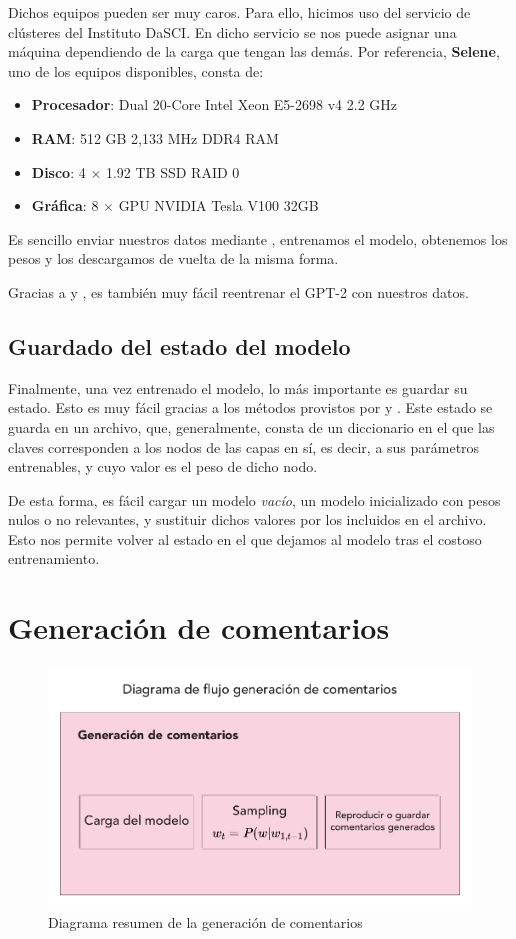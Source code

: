 Dichos equipos pueden ser muy caros. Para ello, hicimos uso del servicio de clústeres del Instituto DaSCI. En dicho servicio se nos puede asignar una máquina dependiendo de la carga que tengan las demás. Por referencia, \textbf{Selene}, uno de los equipos disponibles, consta de:
\begin{itemize}
	\item \textbf{Procesador}: Dual 20-Core Intel Xeon E5-2698 v4 2.2 GHz
	\item \textbf{RAM}: 512 GB 2,133 MHz DDR4 RAM
	\item \textbf{Disco}: 4 $\times$ 1.92 TB SSD RAID 0
	\item \textbf{Gráfica}: 8 $\times$ GPU NVIDIA Tesla V100 32GB 
\end{itemize}

Es sencillo enviar nuestros datos mediante , entrenamos el modelo, obtenemos los pesos y los descargamos de vuelta de la misma forma.

Gracias a  y , es también muy fácil reentrenar el GPT-2 con nuestros datos.

\subsection{Guardado del estado del modelo}
Finalmente, una vez entrenado el modelo, lo más importante es guardar su estado. Esto es muy fácil gracias a los métodos provistos por  y . Este estado se guarda en un archivo, que, generalmente, consta de un diccionario en el que las claves corresponden a los nodos de las capas en sí, es decir, a sus parámetros entrenables, y cuyo valor es el peso de dicho nodo. 

De esta forma, es fácil cargar un modelo \textit{vacío}, un modelo inicializado con pesos nulos o no relevantes, y sustituir dichos valores por los incluidos en el archivo. Esto nos permite volver al estado en el que dejamos al modelo tras el costoso entrenamiento.

\section{Generación de comentarios}

\begin{figure}[h]
	\centering
	\includegraphics[width=.9\textwidth]{media/comment-gen.pdf}
	\caption{Diagrama resumen de la generación de comentarios}
	\label{fig:comment-gen}
\end{figure}

